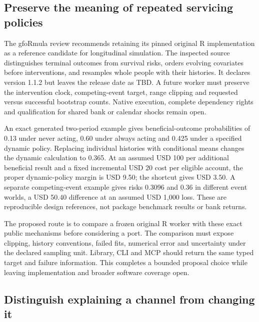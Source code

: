 \hypertarget{preserve-the-meaning-of-repeated-servicing-policies}{%
\subsection{Preserve the meaning of repeated servicing
policies}\label{preserve-the-meaning-of-repeated-servicing-policies}}

The gfoRmula review recommends retaining its pinned original R
implementation as a reference candidate for longitudinal simulation. The
inspected source distinguishes terminal outcomes from survival risks,
orders evolving covariates before interventions, and resamples whole
people with their histories. It declares version 1.1.2 but leaves the
release date as TBD. A future worker must preserve the intervention
clock, competing-event target, range clipping and requested versus
successful bootstrap counts. Native execution, complete dependency
rights and qualification for shared bank or calendar shocks remain
open.\citep{exec20_gformula_reuse}

An exact generated two-period example gives beneficial-outcome
probabilities of 0.13 under never acting, 0.60 under always acting and
0.425 under a specified dynamic policy. Replacing individual histories
with conditional means changes the dynamic calculation to 0.365. At an
assumed USD 100 per additional beneficial result and a fixed incremental
USD 20 cost per eligible account, the proper dynamic-policy margin is
USD 9.50; the shortcut gives USD 3.50. A separate competing-event
example gives risks 0.3096 and 0.36 in different event worlds, a USD
50.40 difference at an assumed USD 1,000 loss. These are reproducible
design references, not package benchmark results or bank
returns.\citep{exec20_gformula_reference}

The proposed route is to compare a frozen original R worker with these
exact public mechanisms before considering a port. The comparison must
expose clipping, history conventions, failed fits, numerical error and
uncertainty under the declared sampling unit. Library, CLI and MCP
should return the same typed target and failure information. This
completes a bounded proposal choice while leaving implementation and
broader software coverage
open.\citep{exec20_gformula_reuse,exec20_gformula_reference}

\hypertarget{distinguish-explaining-a-channel-from-changing-it}{%
\subsection{Distinguish explaining a channel from changing
it}\label{distinguish-explaining-a-channel-from-changing-it}}

